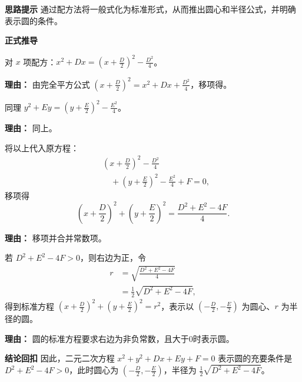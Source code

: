 \begin{proofbox}
	\textbf{\textcolor{CProof}{思路提示}}
	通过配方法将一般式化为标准形式，从而推出圆心和半径公式，并明确表示圆的条件。

	\medskip
	\textbf{\textcolor{CProof}{正式推导}}
	\begin{description}[style=nextline, leftmargin=2.8em, labelsep=0.5em, itemsep=0.55em]
		\item[\textbf{步骤一（配方x项）：}]
			对 $x$ 项配方：$x^2+Dx = \left(x+\frac{D}{2}\right)^2 - \frac{D^2}{4}$。
			\par\textbf{理由：} 由完全平方公式 $\left(x+\frac{D}{2}\right)^2 = x^2+Dx+\frac{D^2}{4}$，移项得。
		\item[\textbf{步骤二（配方y项）：}]
			同理 $y^2+Ey = \left(y+\frac{E}{2}\right)^2 - \frac{E^2}{4}$。
			\par\textbf{理由：} 同上。
		\item[\textbf{步骤三（代入合并）：}]
			将以上代入原方程：
			\[
				\begin{aligned}
					&\left(x+\frac{D}{2}\right)^2 - \frac{D^2}{4} \\ &\quad + \left(y+\frac{E}{2}\right)^2 - \frac{E^2}{4} + F = 0,
			\end{aligned}
			\]
			移项得
			\[
				\left(x+\frac{D}{2}\right)^2 + \left(y+\frac{E}{2}\right)^2 = \frac{D^2+E^2-4F}{4}.
			\]
			\par\textbf{理由：} 移项并合并常数项。
		\item[\textbf{步骤四（判号得圆）：}]
			若 $D^2+E^2-4F > 0$，则右边为正，令
			\[
				\begin{aligned}
					r &= \sqrt{\frac{D^2+E^2-4F}{4}} \\ &= \frac12\sqrt{D^2+E^2-4F},
			\end{aligned}
			\]
			得到标准方程 $\left(x+\frac{D}{2}\right)^2+\left(y+\frac{E}{2}\right)^2 = r^2$，表示以 $\left(-\frac{D}{2},-\frac{E}{2}\right)$ 为圆心、$r$ 为半径的圆。
			\par\textbf{理由：} 圆的标准方程要求右边为非负常数，且大于0时表示圆。
	\end{description}

	\medskip
	\textbf{\textcolor{CProof}{结论回扣}}
	因此，二元二次方程 $x^2+y^2+Dx+Ey+F=0$ 表示圆的充要条件是 $D^2+E^2-4F>0$，此时圆心为 $\left(-\frac{D}{2},-\frac{E}{2}\right)$，半径为 $\frac12\sqrt{D^2+E^2-4F}$。
\end{proofbox}

